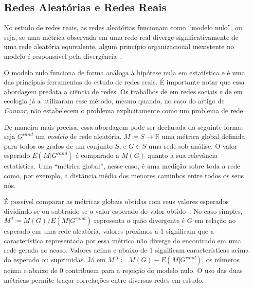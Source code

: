\documentclass[12pt,a4paper]{article}
\theoremstyle{hypo}
\newcommand{\R}{\mathbb{R}}
\newcommand{\defn}{\coloneqq} %
\begin{document}
\subsection{Redes Aleatórias e Redes Reais} \label{sec:redes-aleatorias}

No estudo de redes reais, as redes aleatórias funcionam como \enquote{modelo nulo}, ou seja, se uma métrica observada em uma rede real diverge significativamente de uma rede aleatória equivalente, algum princípio organizacional inexistente no modelo é responsável pela divergência~\cite{Zweig2016-rb}.

O modelo nulo funciona de forma análoga à hipótese nula em estatística e é uma das principais ferramentas do estudo de redes reais. É importante notar que essa abordagem predata a ciência de redes. Os trabalhos de  em redes sociais e de  em ecologia já a utilizaram esse método, mesmo quando, no caso do artigo de \textit{Connor}, não estabelecem o problema explicitamente como um problema de rede.

De maneira mais precisa, essa abordagem pode ser declarada da seguinte forma: seja $G^\textit{rand}$ um \textit{modelo} de rede aleatória, $M \defn S \to \R$ uma métrica global definida para todos os grafos de um conjunto $S$, e $G \in S$ uma rede sob análise. O valor esperado $E(M|G^\textit{rand})$ é comparado a $M(G)$ quanto a sua relevância estatística. Uma \enquote{métrica global}, nesse caso, é uma medição sobre toda a rede como, por exemplo, a distância média dos menores caminhos entre todos os seus nós.

É possível comparar as métricas globais obtidas com seus valores esperados dividindo-se ou subtraído-se o valor esperado do valor obtido~\cite{Zweig2016-rb}. No caso simples, $M^d \defn M(G) / E(M|G^\textit{rand})$ representa o quão divergente é $G$ em relação ao esperado em uma rede aleatória, valores próximos a 1 significam que a característica representada por essa métrica não diverge do encontrado em uma rede gerada ao acaso. Valores acima e abaixo de 1 significam características acima do esperado ou suprimidas. Já em $M^\Delta \defn M(G) - E(M|G^\textit{rand})$, os números acima e abaixo de 0 contribuem para a rejeição do modelo nulo. O uso das duas métricas permite traçar correlações entre diversas redes em estudo.
\end{document}
